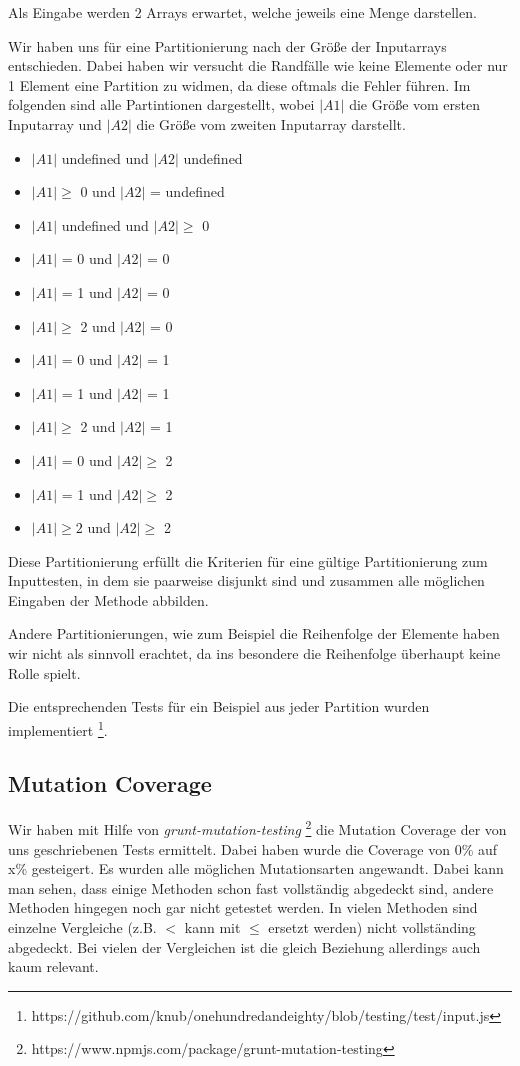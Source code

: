 \documentclass[ngerman]{article}
\begin{document}
Als Eingabe werden 2 Arrays erwartet, welche jeweils eine Menge darstellen.

Wir haben uns für eine Partitionierung nach der Größe der Inputarrays entschieden. Dabei haben wir versucht die Randfälle wie keine Elemente oder nur 1 Element eine Partition zu widmen, da diese oftmals die Fehler führen. Im folgenden sind alle Partintionen dargestellt, wobei \emph{$|A1|$} die Größe vom ersten Inputarray und \emph{$|A2|$} die Größe vom zweiten Inputarray darstellt.
\begin{itemize}
\item $|A1|$ undefined und $|A2|$ undefined
\item $|A1| \geq$ 0 und $|A2|$ = undefined
\item $|A1|$ undefined und $|A2| \geq$ 0
\item $|A1|$ = 0 und $|A2|$ = 0
\item $|A1|$ = 1 und $|A2|$ = 0
\item $|A1| \geq$ 2 und $|A2|$ = 0
\item $|A1|$ = 0 und $|A2|$ = 1
\item $|A1|$ = 1 und $|A2|$ = 1
\item $|A1| \geq$ 2 und $|A2|$ = 1
\item $|A1|$ = 0 und $|A2| \geq$ 2
\item $|A1|$ = 1 und $|A2| \geq$  2
\item $|A1| \geq 2$ und $|A2| \geq $ 2
\end{itemize}

Diese Partitionierung erfüllt die Kriterien für eine gültige Partitionierung zum Inputtesten, in dem sie paarweise disjunkt sind und zusammen alle möglichen Eingaben der Methode abbilden.

Andere Partitionierungen, wie zum Beispiel die Reihenfolge der Elemente haben wir nicht als sinnvoll erachtet, da ins besondere die Reihenfolge überhaupt keine Rolle spielt.

Die entsprechenden Tests für ein Beispiel aus jeder Partition wurden implementiert \footnote{https://github.com/knub/onehundredandeighty/blob/testing/test/input.js}.



\subsection{Mutation Coverage}
Wir haben mit Hilfe von \emph{grunt-mutation-testing} \footnote{https://www.npmjs.com/package/grunt-mutation-testing} die Mutation Coverage der von uns geschriebenen Tests ermittelt.
Dabei haben wurde die Coverage von 0\% auf x\% gesteigert. Es wurden alle möglichen Mutationsarten angewandt. Dabei kann man sehen, dass einige Methoden schon fast vollständig abgedeckt sind, andere Methoden hingegen noch gar nicht getestet werden. In vielen Methoden sind einzelne Vergleiche (z.B. $<$ kann mit $\leq$ ersetzt werden) nicht vollständing abgedeckt. Bei vielen der Vergleichen ist die gleich Beziehung allerdings auch kaum relevant.
\end{document}

